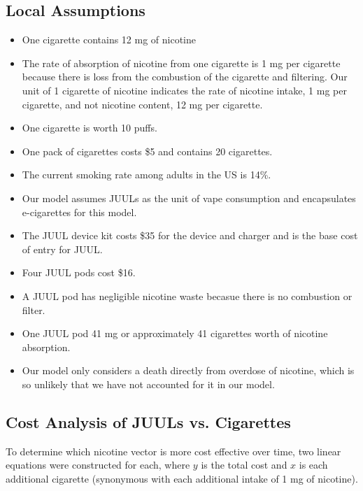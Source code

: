\documentclass[12pt,letterpaper]{article}
\begin{document}
\subsection{Local Assumptions}
\begin{itemize}
  \item One cigarette contains 12 mg of nicotine \citep{matthews_how_2017}
  \item The rate of absorption of nicotine from one cigarette is 1 mg per cigarette because there is loss from the combustion of the cigarette and filtering. Our unit of 1 cigarette of nicotine indicates the rate of nicotine intake, 1 mg per cigarette, and not nicotine content, 12 mg per cigarette. \citep[501]{benowitz_daily_1984}
  \item One cigarette is worth 10 puffs. \citep{noauthor_e-cigarette_2014}
  \item One pack of cigarettes costs \$5 and contains 20 cigarettes.
  \item The current smoking rate among adults in the US is 14\%.
  \item Our model assumes JUULs as the unit of vape consumption and encapsulates e-cigarettes for this model.
  \item The JUUL device kit costs \$35 for the device and charger and is the base cost of entry for JUUL. \citep{noauthor_juul_nodate}
  \item Four JUUL pods cost \$16. \citep{noauthor_buy_nodate}
  \item A JUUL pod has negligible nicotine waste becasue there is no combustion or filter.
  \item One JUUL pod 41 mg or approximately 41 cigarettes worth of nicotine absorption. \citep{noauthor_juulpods_nodate}
  \item Our model only considers a death directly from overdose of nicotine, which is so unlikely that we have not accounted for it in our model.
\end{itemize}

\subsection{Cost Analysis of JUULs vs. Cigarettes}
To determine which nicotine vector is more cost effective over time, two linear equations were constructed for each, where $y$ is the total cost and $x$ is each additional cigarette (synonymous with each additional intake of 1 mg of nicotine).
\end{document}
